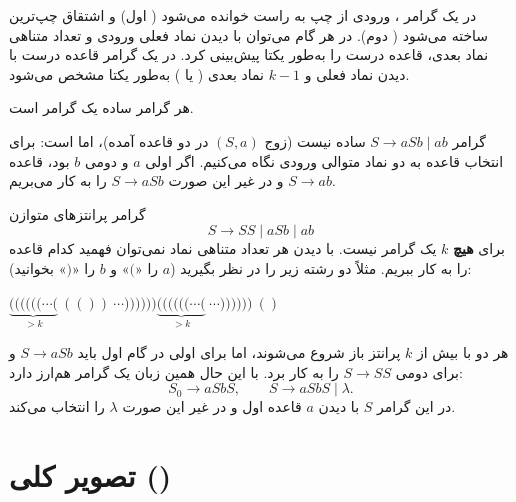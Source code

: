 \begin{definition}[گرامر \lr{LL}]
در یک گرامر ، ورودی از چپ به راست خوانده می‌شود ( اول) و اشتقاق چپ‌ترین ساخته می‌شود ( دوم). در هر گام می‌توان با دیدن نماد فعلی ورودی و تعداد متناهی نماد بعدی، قاعده درست را به‌طور یکتا پیش‌بینی کرد. در یک گرامر  قاعده درست با دیدن نماد فعلی و $k-1$ نماد بعدی ( یا ) به‌طور یکتا مشخص می‌شود.
\end{definition}

هر گرامر ساده یک گرامر  است.

\begin{example}
گرامر $S\to aSb\mid ab$ ساده نیست (زوج $(S,a)$ در دو قاعده آمده)، اما  است: برای انتخاب قاعده به دو نماد متوالی ورودی نگاه می‌کنیم. اگر اولی $a$ و دومی $b$ بود، قاعده $S\to ab$ و در غیر این صورت $S\to aSb$ را به کار می‌بریم.
\end{example}

\begin{example}
گرامر پرانتزهای متوازن
\[S\to SS\mid aSb\mid ab\]
برای \textbf{هیچ} $k$ یک گرامر  نیست. با دیدن هر تعداد متناهی نماد نمی‌توان فهمید کدام قاعده را به کار ببریم. مثلاً دو رشته زیر را در نظر بگیرید ($a$ را «$($» و $b$ را «$)$» بخوانید):
\begin{ltrfig}
$\underbrace{((((((\cdots(}_{>k}\ (())\ \cdots))))))$\qquad\qquad$\underbrace{((((((\cdots(}_{>k}\ \cdots))))))\ ()$
\end{ltrfig}
هر دو با بیش از $k$ پرانتز باز شروع می‌شوند، اما برای اولی در گام اول باید $S\to aSb$ و برای دومی $S\to SS$ را به کار برد. با این حال همین زبان یک گرامر  هم‌ارز دارد:
\[S_0\to aSbS,\qquad S\to aSbS\mid\lambda.\]
در این گرامر $S$ با دیدن $a$ قاعده اول و در غیر این صورت $\lambda$ را انتخاب می‌کند.
\end{example}

\section{تصویر کلی ()}

